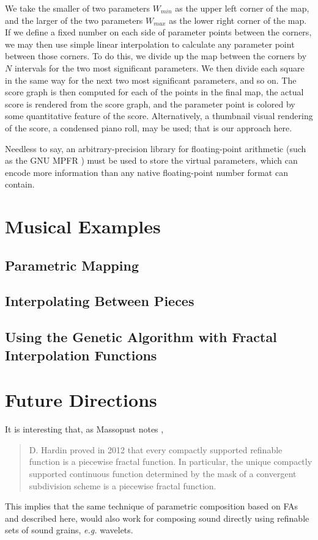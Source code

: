 \documentclass[english,11pt,letterpaper,onecolumn]{scrartcl}
\numberwithin{equation}{section}
\begin{document}
We take the smaller of two parameters $W_{min}$ as the upper left corner of the
map, and the larger of the two parameters $W_{max}$ as the lower right corner of
the map. If we define a fixed number on each side of parameter points between
the corners, we may then use simple linear interpolation to calculate any
parameter point between those corners. To do this, we divide up the map between
the corners by $N$ intervals for the two most significant parameters. We then
divide each square in the same way for the next two most significant parameters,
and so on. The score graph is then computed for each of the points in the final
map, the actual score is rendered from the score graph, and the parameter point
is colored by some quantitative feature of the score. Alternatively, a thumbnail
visual rendering of the score, a condensed piano roll, may be used; that is our
approach here.

Needless to say, an arbitrary-precision library for floating-point arithmetic
(such as the GNU MPFR \cite{Fousse:2007:MMB:1236463.1236468}) must be used to
store the virtual parameters, which can encode more information than any native
floating-point number format can contain.

\section{Musical Examples}

\subsection{Parametric Mapping}

\subsection{Interpolating Between Pieces}

\subsection{Using the Genetic Algorithm with Fractal Interpolation
Functions}

\section{Future Directions}

It is interesting that, as Massopust notes \cite{massopust2017}, \begin{quote}D.
Hardin proved in 2012 that every compactly supported refinable function is a
piecewise fractal function. In particular, the unique compactly supported
continuous function determined by the mask of a convergent subdivision scheme is
a piecewise fractal function. \end{quote} This implies that the same technique
of parametric composition based on FAs and described here, would also work for
composing sound directly using refinable sets of sound grains, \textit{e.g.}
wavelets.
\end{document}
